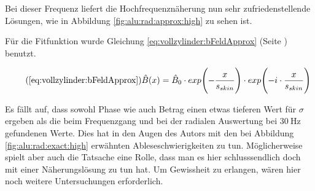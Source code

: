 {	\begin{minipage}[t]{0.33\textwidth}
        \vspace{0mm}
        Bei    dieser    Frequenz     liefert    die    Hochfrequenzn\"aherung
        nun   sehr    zufriedenstellende   L\"osungen,   wie    in   Abbildung
        \ref{fig:alu:rad:approx:high} zu sehen ist.

        F\"ur               die                Fitfunktion               wurde
        Gleichung           \ref{eq:vollzylinder:bFeldApprox}           (Seite
        \pageref{eq:vollzylinder:bFeldApprox}) benutzt.

        \begin{equation}
            \tag{\ref{eq:vollzylinder:bFeldApprox}}
            \hat{B} (x) = \hat{B}_0 \cdot exp\Biggl(-\frac{x}{s_{skin}} \Biggr) \cdot exp\Biggl(-i \cdot \frac{x}{s_{skin}} \Biggr)
        \end{equation}

        

        \vspace{1em}

        Es  f\"allt  auf,  dass  sowohl  Phase wie  auch  Betrag  einen  etwas
        tieferen  Wert  f\"ur  $\sigma$  ergeben  als  die  beim  Frequenzgang
        und  bei  der  radialen Auswertung  bei  $\SI{30}{\hertz}$  gefundenen
        Werte. Dies  hat  in  den  Augen  des Autors  mit  den  bei  Abbildung
        \ref{fig:alu:rad:exact:high}   erw\"ahnten  Ableseschwierigkeiten   zu
        tun. M\"oglicherweise  spielt  aber  auch  die  Tatsache  eine  Rolle,
        dass man  es hier  schlusssendlich doch mit  einer N\"aherungsl\"osung
        zu  tun hat. Um  Gewissheit  zu erlangen,  w\"aren  hier noch  weitere
        Untersuchungen erforderlich.
	\end{minipage}%
	\begin{minipage}[t]{0.67\textwidth}
        \vspace{0mm}
        \resizebox{.95\textwidth}{!}{}
        \label{fig:alu:rad:approx:high}
	\end{minipage}

}

